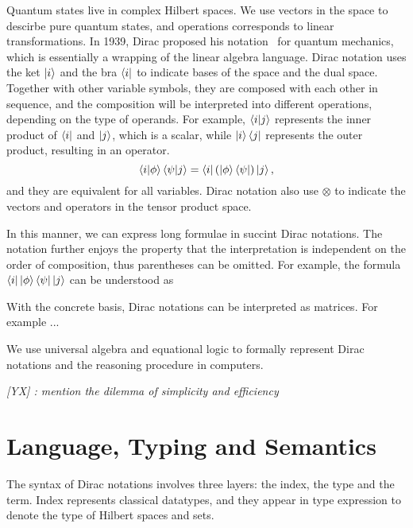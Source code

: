 \documentclass[runningheads]{llncs}
\newcommand{\yx}[1]{\textit{\color{blue}[YX] : #1}}
\begin{document}
Quantum states live in complex Hilbert spaces. We use vectors in the space to descirbe pure quantum states, and operations corresponds to linear transformations. 
In 1939, Dirac proposed his notation~\cite{dirac1939new} for quantum mechanics, which is essentially a wrapping of the linear algebra language. 
Dirac notation uses the ket $\ket{i}$ and the bra $\bra{i}$ to indicate bases of the space and the dual space. Together with other variable symbols, they are composed with each other in sequence, and the composition will be interpreted into different operations, depending on the type of operands. For example, $\braket{i|j}$ represents the inner product of $\bra{i}$ and $\ket{j}$, which is a scalar, while $\ket{i}\bra{j}$ represents the outer product, resulting in an operator. 
\[
    \braket{i|\phi}\braket{\psi|j} = \bra{i} (\ket{\phi}\bra{\psi}) \ket{j},
\]
and they are equivalent for all variables.
Dirac notation also use $\otimes$ to indicate the vectors and operators in the tensor product space.

In this manner, we can express long formulae in succint Dirac notations. The notation further enjoys the property that the interpretation is independent on the order of composition, thus parentheses can be omitted. For example, the formula \(\bra{i}\ket{\phi}\bra{\psi}\ket{j}\) can be understood as

With the concrete basis, Dirac notations can be interpreted as matrices. For example ...



We use universal algebra and equational logic to formally represent Dirac notations and the reasoning procedure in computers.

\yx{mention the dilemma of simplicity and efficiency}


\section{Language, Typing and Semantics}
The syntax of Dirac notations involves three layers: the index, the type and the term. 
Index represents classical datatypes, and they appear in type expression to denote the type of Hilbert spaces and sets.
\end{document}
